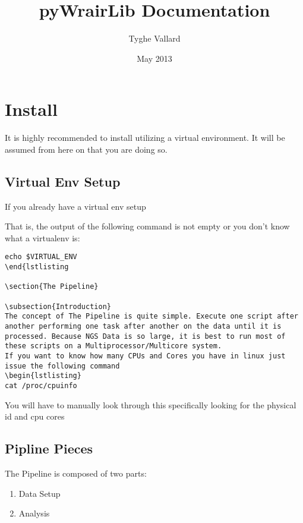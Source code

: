 \documentclass{article}
\begin{document}
\title{pyWrairLib Documentation}
\author{Tyghe Vallard}
\date{May 2013}
\maketitle
\tableofcontents

\section{Install}
It is highly recommended to install utilizing a virtual environment. It will be assumed from here on that you are doing so.

\subsection{Virtual Env Setup}
If you already have a virtual env setup

That is, the output of the following command is not empty or you don't know what a virtualenv is:
\begin{lstlisting}
echo $VIRTUAL_ENV
\end{lstlisting

\section{The Pipeline}

\subsection{Introduction}
The concept of The Pipeline is quite simple. Execute one script after another performing one task after another on the data until it is processed. Because NGS Data is so large, it is best to run most of these scripts on a Multiprocessor/Multicore system.
If you want to know how many CPUs and Cores you have in linux just issue the following command
\begin{lstlisting}
cat /proc/cpuinfo
\end{lstlisting}
You will have to manually look through this specifically looking for the physical id and cpu cores

\subsection{Pipline Pieces}
The Pipeline is composed of two parts:
\begin{enumerate}
\item Data Setup
\item Analysis
\end{enumerate}
\end{document}
